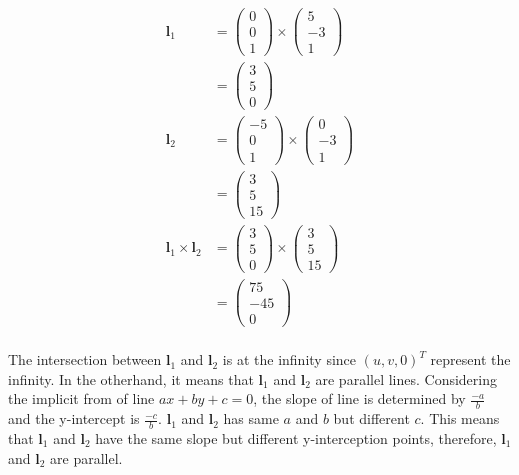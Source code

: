 \documentclass[11pt]{article}
\begin{document}
\begin{enumerate}
\begin{align*}
\mathbf{l}_1 &= 
	\begin{pmatrix}
		0 \\ 0 \\ 1
	\end{pmatrix} 
	\times
	\begin{pmatrix}
		5 \\ -3 \\ 1
	\end{pmatrix}\\
&= 
	\begin{pmatrix}
		3 \\ 5 \\ 0
	\end{pmatrix}\\
\mathbf{l}_2 &= 
	\begin{pmatrix}
		-5 \\ 0 \\ 1
	\end{pmatrix} 
	\times
	\begin{pmatrix}
		0 \\ -3 \\ 1
	\end{pmatrix}\\
&= 
	\begin{pmatrix}
		3 \\ 5 \\ 15
	\end{pmatrix}\\
\mathbf{l}_1 \times  \mathbf{l}_2&= 
	\begin{pmatrix}
		3 \\ 5 \\ 0
	\end{pmatrix} 
	\times
	\begin{pmatrix}
		3 \\ 5 \\ 15
	\end{pmatrix}\\
&= 
	\begin{pmatrix}
		75 \\ -45 \\ 0
	\end{pmatrix}\\
\end{align*}

The intersection between $\mathbf{l}_1$ and $\mathbf{l}_2$ is at the infinity since $(u,v,0)^T$ represent the infinity. In the otherhand, it means that $\mathbf{l}_1$ and $\mathbf{l}_2$ are parallel lines. Considering the implicit from of line $ax+by+c = 0$, the slope of line is determined by $\frac{-a}{b}$ and the y-intercept is $\frac{-c}{b}$.  $\mathbf{l}_1$ and $\mathbf{l}_2$ has same $a$ and $b$ but different $c$. This means that  $\mathbf{l}_1$ and $\mathbf{l}_2$ have the same slope but different y-interception points, therefore,  $\mathbf{l}_1$ and $\mathbf{l}_2$ are parallel.


\end{enumerate}
\end{document}
